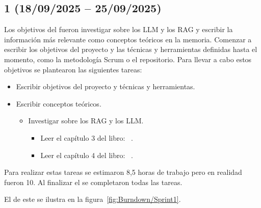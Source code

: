 \subsection{ 1 (18/09/2025 -- 25/09/2025)}
Los objetivos del  fueron investigar sobre los LLM y los RAG y escribir la información más relevante como conceptos teóricos en la memoria. Comenzar a escribir los objetivos del proyecto y las técnicas y herramientas definidas hasta el momento, como la metodología Scrum o el repositorio. 
Para llevar a cabo estos objetivos se plantearon las siguientes tareas:
\begin{itemize}
\tightlist
	\item Escribir objetivos del proyecto y técnicas y herramientas.
	\item Escribir conceptos teóricos.
	\begin{itemize}
	\tightlist
		\item Investigar sobre los RAG y los LLM.
		\begin{itemize}
		\tightlist
			\item Leer el capítulo 3 del libro: ~\cite{book:RAG_SimpleGuide}.
			\item Leer el capítulo 4 del libro: ~\cite{book:RAG_SimpleGuide}.
		\end{itemize}
	\end{itemize}
\end{itemize}

Para realizar estas tareas se estimaron 8,5 horas de trabajo pero en realidad fueron 10. Al finalizar el  se completaron todas las tareas.

El  de este  se ilustra en la figura~\ref{fig:Burndown/Sprint1}.

